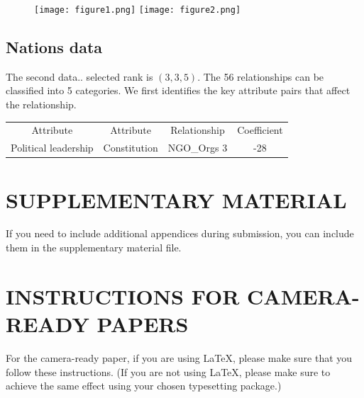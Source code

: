 \documentclass[11pt]{article}
\theoremstyle{plain}
\theoremstyle{definition}
\begin{document}
{\begin{figure}[H]
\texttt{[image: figure1.png]}
\texttt{[image: figure2.png]}
\end{figure}

\subsection{Nations data}
The second data.. selected rank is $(3,3,5)$. The 56 relationships can be classified into 5 categories. We first identifies the key attribute pairs that affect the relationship. 

\begin{tabular}{cccc}
Attribute & Attribute & Relationship & Coefficient\\
Political leadership & Constitution & NGO\_Orgs 3& -28&\\

\end{tabular}
 

\section{SUPPLEMENTARY MATERIAL}

If you need to include additional appendices during submission, you
can include them in the supplementary material file.



\section{INSTRUCTIONS FOR CAMERA-READY PAPERS}

For the camera-ready paper, if you are using \LaTeX, please make sure
that you follow these instructions.  (If you are not using \LaTeX,
please make sure to achieve the same effect using your chosen
typesetting package.)

}
\end{document}
